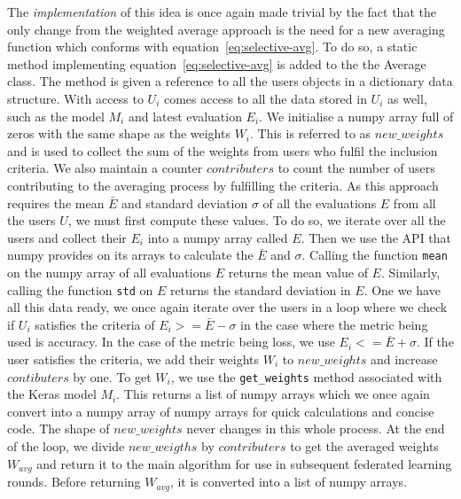 \documentclass[12pt]{article}
\begin{document}
The \textit{implementation} of this idea is once again made trivial by the fact that the only change from the weighted average approach is the need for a new averaging function which conforms with equation~\ref{eq:selective-avg}. To do so, a static method implementing equation~\ref{eq:selective-avg} is added to the the Average class. The method is given a reference to all the users objects in a dictionary data structure. With access to $U_i$ comes access to all the data stored in $U_i$ as well, such as the model $M_i$ and latest evaluation $E_i$. We initialise a numpy array full of zeros with the same shape as the weights $W_i$. This is referred to as $new\_weights$ and is used to collect the sum of the weights from users who fulfil the inclusion criteria. We also maintain a counter $contributers$ to count the number of users contributing to the averaging process by fulfilling the criteria. As this approach requires the mean $\bar{E}$ and standard deviation $\sigma$ of all the evaluations $E$ from all the users $U$, we must first compute these values. To do so, we iterate over all the users and collect their $E_i$ into a numpy array called $E$. Then we use the API that numpy provides on its arrays to calculate the $\bar{E}$ and $\sigma$. Calling the function \texttt{mean} on the numpy array of all evaluations $E$ returns the mean value of $E$. Similarly, calling the function \texttt{std} on $E$ returns the standard deviation in $E$. One we have all this data ready, we once again iterate over the users in a loop where we check if $U_i$ satisfies the criteria of $E_i >= \bar{E}-\sigma$ in the case where the metric being used is accuracy. In the case of the metric being loss, we use $E_i <= \bar{E}+\sigma$. If the user satisfies the criteria, we add their weights $W_i$ to $new\_weights$ and increase $contibuters$ by one. To get $W_i$, we use the \texttt{get\_weights} method associated with the Keras model $M_i$. This returns a list of numpy arrays which we once again convert into a numpy array of numpy arrays for quick calculations and concise code. The shape of $new\_weights$ never changes in this whole process. At the end of the loop, we divide $new\_weigths$ by $contributers$ to get the averaged weights $W_{avg}$ and return it to the main algorithm for use in subsequent federated learning rounds. Before returning $W_{avg}$, it is converted into a list of numpy arrays.
\end{document}
